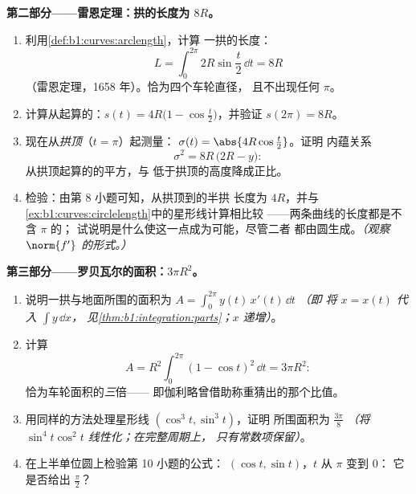 \begin{problem}
\medskip
\noindent\textbf{第二部分——雷恩定理：拱的长度为
$8R$。}
\begin{enumerate}[resume]
  \item 利用\cref{def:b1:curves:arclength}，计算
        一拱的长度：
        \[
        L = \int_0^{2\pi} 2R\sin\frac t2\,\dd t = 8R
        \]
        （雷恩定理，1658 年）。恰为四个车轮直径，
        且不出现任何 $\pi$。
  \item 计算从起算的：$s(t) =
        4R\bigl(1 - \cos\frac t2\bigr)$，并验证 $s(2\pi) =
        8R$。
  \item 现在从\emph{拱顶}（$t = \pi$）起测量：
        $\sigma(t) = \abs{4R\cos\frac t2}$。证明
        内蕴关系
        \[
        \sigma^2 = 8R\,\bigl(2R - y\bigr) :
        \]
        从拱顶起算的的平方，与
        低于拱顶的高度降成正比。
  \item 检验：由第 8 小题可知，从拱顶到的半拱
        长度为 $4R$，并与
        \cref{ex:b1:curves:circlelength}中的星形线计算相比较
——两条曲线的长度都是不含 $\pi$ 的；
        试说明是什么使这一点成为可能，尽管二者
        都由圆生成。\emph{（观察
        $\norm{f'}$ 的形式。）}
\end{enumerate}

\medskip
\noindent\textbf{第三部分——罗贝瓦尔的面积：$3\pi R^2$。}
\begin{enumerate}[resume]
  \item 说明一拱与地面所围的面积为
        $A = \int_0^{2\pi} y(t)\,x'(t)\,\dd t$ \emph{（即
        将 $x = x(t)$ 代入 $\int y\,\dd x$，
        见\cref{thm:b1:integration:parts}；$x$ 递增）}。
  \item 计算
        \[
        A = R^2\int_0^{2\pi}(1 - \cos t)^2\,\dd t = 3\pi R^2 :
        \]
        恰为车轮面积的\emph{三}倍——
        即伽利略曾借助称重猜出的那个比值。
  \item 用同样的方法处理星形线 $(\cos^3t, \sin^3t)$，证明
        所围面积为 $\frac{3\pi}8$
        \emph{（将 $\sin^4 t\cos^2 t$ 线性化；在完整周期上，
        只有常数项保留）}。
  \item 在上半单位圆上检验第 10 小题的公式：
        $(\cos t, \sin t)$，$t$ 从 $\pi$ 变到 $0$：
        它是否给出 $\frac\pi2$？
\end{enumerate}


\end{problem}
